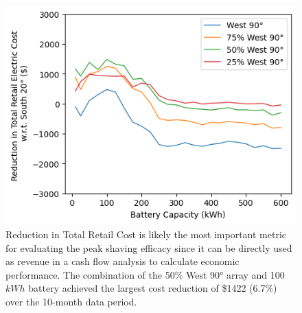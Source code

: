 \documentclass[conference]{IEEEtran}
\begin{document}
\begin{figure}
    \centering
    \includegraphics[width=0.75\linewidth]{images/total cost reduction.png}
    \caption{Reduction in Total Retail Cost is likely the most important metric for evaluating the peak shaving efficacy since it can be directly used as revenue in a cash flow analysis to calculate economic performance. The combination of the 50\% West 90° array and 100 $kWh$ battery achieved the largest cost reduction of \$1422 (6.7\%) over the 10-month data period.}
    \label{fig:total-cost-reduction}
\end{figure}
\end{document}
